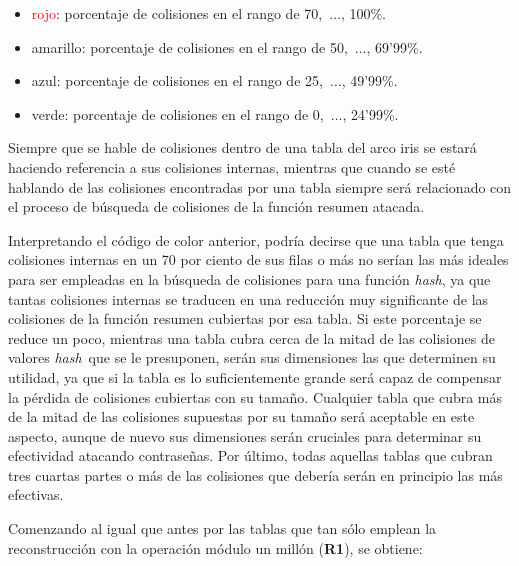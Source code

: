 \documentclass[12pt,spanish,listoffigures,listoftables,listofalgorithms]{tfgetsinf}
\newcommand{\hash}{\textit{hash}}
\begin{document}
\begin{itemize}

    \item \textcolor{red}{rojo}: porcentaje de colisiones en el rango de 70,~$\dots$, 100\%.
    
    \item \textcolor{y}{amarillo}: porcentaje de colisiones en el rango de 50,~$\dots$, 69'99\%.
    
    \item \textcolor{b}{azul}: porcentaje de colisiones en el rango de 25,~$\dots$, 49'99\%.

    \item \textcolor{g}{verde}: porcentaje de colisiones en el rango de 0,~$\dots$, 24'99\%.
    
\end{itemize}

Siempre que se hable de colisiones dentro de una tabla del arco iris se estará haciendo referencia a sus colisiones internas, mientras que cuando se esté hablando de las colisiones encontradas por una tabla siempre será relacionado con el proceso de búsqueda de colisiones de la función resumen atacada.

Interpretando el código de color anterior, podría decirse que una tabla que tenga colisiones internas en un 70 por ciento de sus filas o más no serían las más ideales para ser empleadas en la búsqueda de colisiones para una función \hash, ya que tantas colisiones internas se traducen en una reducción muy significante de las colisiones de la función resumen cubiertas por esa tabla. Si este porcentaje se reduce un poco, mientras una tabla cubra cerca de la mitad de las colisiones de valores \hash~que se le presuponen, serán sus dimensiones las que determinen su utilidad, ya que si la tabla es lo suficientemente grande será capaz de compensar la pérdida de colisiones cubiertas con su tamaño. Cualquier tabla que cubra más de la mitad de las colisiones supuestas por su tamaño será aceptable en este aspecto, aunque de nuevo sus dimensiones serán cruciales para determinar su efectividad atacando contraseñas. Por último, todas aquellas tablas que cubran tres cuartas partes o más de las colisiones que debería serán en principio las más efectivas.

Comenzando al igual que antes por las tablas que tan sólo emplean la reconstrucción con la operación módulo un millón (\textbf{R1}), se obtiene:
\end{document}
